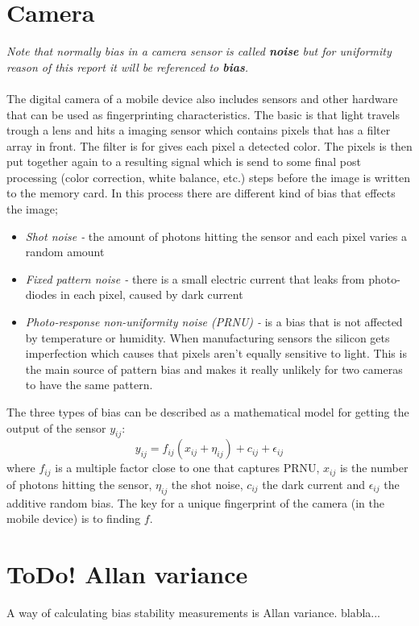 \section{Camera}\label{sec:char:camera}
\textit{Note that normally bias in a camera sensor is called \textbf{noise} but for uniformity reason of this report it will be referenced to \textbf{bias}.}\\
\\
The digital camera of a mobile device also includes sensors and other hardware that can be used as fingerprinting characteristics. The basic is that light travels trough a lens and hits a imaging sensor which contains pixels that has a filter array in front. The filter is for gives each pixel a detected color. The pixels is then put together again to a resulting signal which is send to some final post processing (color correction, white balance, etc.) steps before the image is written to the memory card. In this process there are different kind of bias that effects the image;
\begin{itemize}
	\item[] \textit{Shot noise -} the amount of photons hitting the sensor and each pixel varies a random amount
	\item[] \textit{Fixed pattern noise - }there is a small electric current that leaks from photo-diodes in each pixel, caused by dark current
	\item[] \textit{Photo-response non-uniformity noise (PRNU) -} is a bias that is not affected by temperature or humidity. When manufacturing sensors the silicon gets imperfection which causes that pixels aren't equally sensitive to light. This is the main source of pattern bias and makes it really unlikely for two cameras to have the same pattern.
\end{itemize}
The three types of bias can be described as a mathematical model for getting the output of the sensor $y_{ij}$:
$$y_{ij}=f_{ij}(x_{ij}+\eta_{ij})+c_{ij}+\epsilon_{ij}$$
where $f_{ij}$ is a multiple factor close to one that captures PRNU, $x_{ij}$ is the number of photons hitting the sensor, $\eta_{ij}$ the shot noise, $c_{ij}$ the dark current and $\epsilon_{ij}$ the additive random bias. The key for a unique fingerprint of the camera (in the mobile device) is to finding $f$.
\cite[]{sensor:camera:DCIdent}

\section{\textbf{ToDo!} Allan variance}\label{char:allan}
A way of calculating bias stability measurements is Allan variance. blabla...

